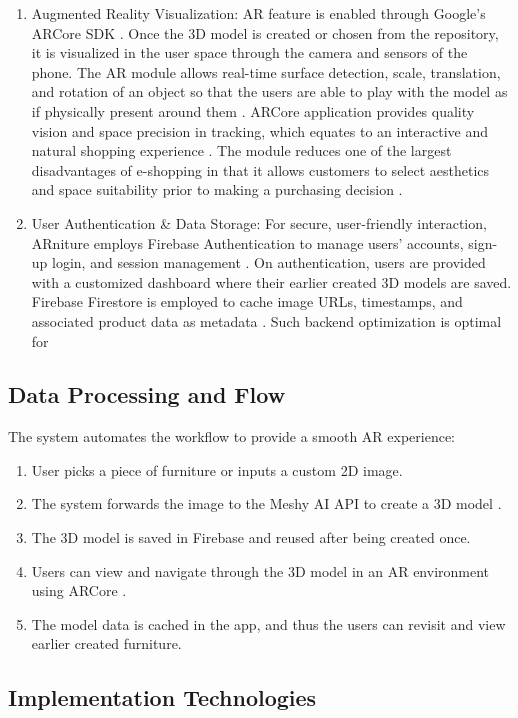 \documentclass[12pt, a4paper]{article}
\begin{document}
\begin{enumerate}
    \item Augmented Reality Visualization: AR feature is enabled through Google's ARCore SDK \cite{ref2}. Once the 3D model is created or chosen from the repository, it is visualized in the user space through the camera and sensors of the phone. The AR module allows real-time surface detection, scale, translation, and rotation of an object so that the users are able to play with the model as if physically present around them \cite{ref7}. ARCore application provides quality vision and space precision in tracking, which equates to an interactive and natural shopping experience \cite{ref16}. The module reduces one of the largest disadvantages of e-shopping in that it allows customers to select aesthetics and space suitability prior to making a purchasing decision \cite{ref11,ref13}.
    \item User Authentication \& Data Storage: For secure, user-friendly interaction, ARniture employs Firebase Authentication to manage users' accounts, sign-up login, and session management \cite{ref4,ref18}. On authentication, users are provided with a customized dashboard where their earlier created 3D models are saved. Firebase Firestore is employed to cache image URLs, timestamps, and associated product data as metadata \cite{ref19}. Such backend optimization is optimal for
\end{enumerate}

\subsection{Data Processing and Flow}

The system automates the workflow to provide a smooth AR experience:
\begin{enumerate}
    \item User picks a piece of furniture or inputs a custom 2D image.
    \item The system forwards the image to the Meshy AI API to create a 3D model \cite{ref2}.
    \item The 3D model is saved in Firebase and reused after being created once.
    \item Users can view and navigate through the 3D model in an AR environment using ARCore \cite{ref3}.
    \item The model data is cached in the app, and thus the users can revisit and view earlier created furniture.
\end{enumerate}

\subsection{Implementation Technologies}
\end{document}
